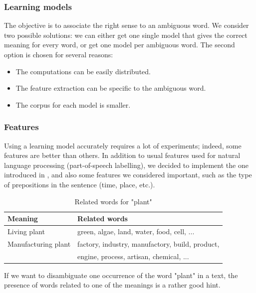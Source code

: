 \documentclass[11pt,a4paper]{article}
\begin{document}
\newpage


\subsubsection{Learning models}

The objective is to associate the right sense to an ambiguous word. We consider two possible solutions: we can either get one single model that gives the correct meaning for every word, or get one model per ambiguous word. The second option is chosen for several reasons:
\begin{itemize}
    \item The computations can be easily distributed.
    \item The feature extraction can be specific to the ambiguous word.
    \item The corpus for each model is smaller.
\end{itemize}

\subsubsection{Features}

Using a learning model accurately requires a lot of experiments; indeed, some features are better than others. In addition to usual features used for natural language processing (part-of-speech labelling), we decided to implement the one introduced in \cite{features}, and also some features we considered important, such as the type of prepositions in the sentence (time, place, etc.).
\\

\begin{table}[H]
    \centering
    \begin{tabular}{|l|l|}
        \hline
        \textbf{Meaning} & \textbf{Related words} \\
        \hline
        Living plant & green, algae, land, water, food, cell, ... \\
        \hline
        Manufacturing plant & factory, industry, manufactory, build, product, \\
        & engine, process, artisan, chemical, ...\\
        \hline
    \end{tabular}
    \caption{Related words for "plant"}
    \label{fig:features}
\end{table}

\noindent If we want to disambiguate one occurrence of the word "plant" in a text, the presence of words related to one of the meanings is a rather good hint.
\end{document}
